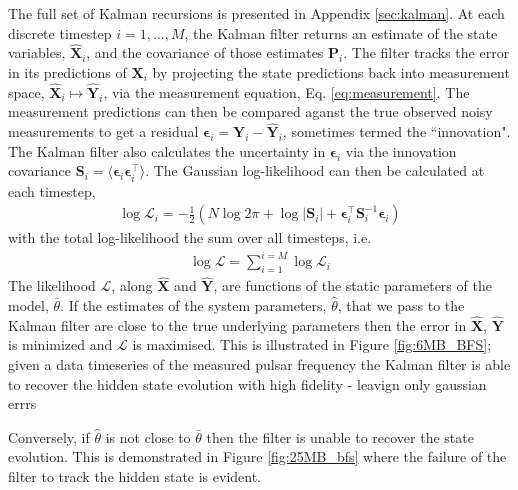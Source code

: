 \documentclass[fleqn,usenatbib,useAMS]{mnras}
\begin{document}
The full set of Kalman recursions is presented in Appendix \ref{sec:kalman}. At each discrete timestep $i = 1, ... , M$, the Kalman filter returns an estimate of the state variables, $\hat{\boldsymbol{X}}_i$, and the covariance of those estimates $\boldsymbol{P}_i$. The filter tracks the error in its predictions of $\boldsymbol{X}_i$ by projecting the state predictions back into measurement space, $\hat{\boldsymbol{X}}_i \mapsto \hat{\boldsymbol{Y}}_i$, via the measurement equation, Eq. \ref{eq:measurement}. The measurement predictions can then be compared aganst the true observed noisy measurements to get a residual $\boldsymbol{\epsilon}_i = \boldsymbol{Y}_i  - \hat{\boldsymbol{Y}}_i$, sometimes termed the ``innovation". The Kalman filter also calculates the uncertainty in $\boldsymbol{\epsilon}_i$ via the innovation covariance $\boldsymbol{S}_i = \langle \boldsymbol{\epsilon}_i \boldsymbol{\epsilon}_i^{\intercal} \rangle$. The Gaussian log-likelihood can then be calculated at each timestep,
\begin{eqnarray}
	\log \mathcal{L}_i =  -\frac{1}{2} \left (N \log 2 \pi + \log  \left | \boldsymbol{S}_i \right | + \boldsymbol{\epsilon}_i^{\intercal} \boldsymbol{S}_i^{-1}  \boldsymbol{\epsilon}_i \right )
\end{eqnarray}
with the total log-likelihood the sum over all timesteps, i.e. 
\begin{eqnarray}
	\log \mathcal{L} =  \sum_{i=1}^{i=M} \log \mathcal{L}_i  \label{eq:likelihood}
\end{eqnarray}
The likelihood $\mathcal{L}$, along $\hat{\boldsymbol{X}}$ and $\hat{\boldsymbol{Y}}$, are functions of the static parameters of the model, $\bar{\theta}$. If the estimates of the system parameters, $\hat{\theta}$, that we pass to the Kalman filter are close to the true underlying parameters then the error in $\hat{\boldsymbol{X}}$, $\hat{\boldsymbol{Y}}$ is minimized and $\mathcal{L}$ is maximised. This is illustrated in Figure \ref{fig:6MB_BFS}; given a data timeseries of the measured pulsar frequency the Kalman filter is able to recover the hidden state evolution with high fidelity - leavign only gaussian errrs







Conversely, if $\hat{\theta}$ is not close to $\bar{\theta}$ then the filter is unable to recover the state evolution. This is demonstrated in Figure \ref{fig:25MB_bfs} where the failure of the filter to track the hidden state is evident. 
\end{document}
